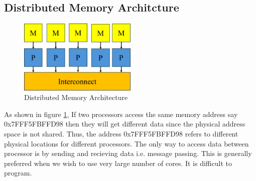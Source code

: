 \documentclass[12pt]{article}
\begin{document}
\subsection{Distributed Memory Architcture}
\begin{figure}[H]
    \centering
    \includegraphics[width=0.5\textwidth]{images/distributed_memory.png}
    \caption{Distributed Memory Architecture}
    \label{fig:distributed_memory}
\end{figure}
As shown in figure \ref{fig:distributed_memory},
If two processors access the same memory address say 0x7FFF5FBFFD98 then they will get different data since 
the physical address space is not shared. Thus, the address 0x7FFF5FBFFD98 refers to different physical locations for different processors.
The only way to access data between processor is by sending and recieving data i.e. message passing.
This is generally preferred when we wish to use very large number of cores.
It is difficult to program.
\end{document}
